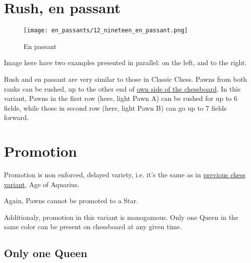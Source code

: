 \clearpage %

\section*{Rush, en passant}
\label{sec:Nineteen/Rush, en passant}

\vspace*{-0.3\baselineskip}
\noindent
\begin{wrapfigure}[14]{l}{0.4\textwidth}
\centering
\texttt{[image: en\_passants/12\_nineteen\_en\_passant.png]}
\caption{En passant}
\label{fig:12_nineteen_en_passant}
\end{wrapfigure}
Image here have two examples presented in parallel: on the left, and to the right.

Rush and en passant are very similar to those in Classic Chess. \newline
\indent
Pawns from both ranks can be rushed, up to the other end of
\hyperref[sec:Definitions/Chessboard sides, navigation]{own side of the chessboard}. \newline
\indent
In this variant, Pawns in the first row (here, light Pawn A) can be rushed for up
to 6 fields, while those in second row (here, light Pawn B) can go up to 7 fields
forward.


\vspace*{-0.9\baselineskip}
\noindent
\section*{Promotion}
\label{sec:Nineteen/Promotion}

Promotion is non enforced, delayed variety, i.e. it's the same as in
\hyperref[sec:Age of Aquarius/Promotion]{previous chess variant}, Age of Aquarius.

Again, Pawns cannot be promoted to a Star.

Additionaly, promotion in this variant is monogamous.
Only one Queen in the same color can be present on chessboard at any given time.

\clearpage %

\subsection*{Only one Queen}
\label{sec:Nineteen/Sideways Pawns/Only one Queen}

